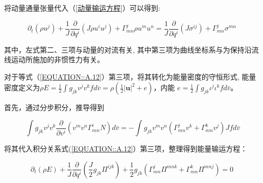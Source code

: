 \documentclass[LBMDerivation.tex]{subfiles}
\begin{document}
将动量通量张量代入（\ref{动量输运方程}）可以得到:

\begin{equation}
  \boxed{
    \partial_{t}\left(\rho u^{j}\right)+\frac{1}{J} \frac{\partial}{\partial q^{i}}\left(J \rho u^{i} u^{j} \right)+\Gamma_{mn}^{j} \rho u^{m} u^{n}
    = \frac{1}{J} \frac{\partial}{\partial q^{i}}\left(J \sigma^{ij} \right) + \Gamma_{mn}^{j} \sigma^{mn} }
  \label{动量方程输运形式} ~
\end{equation}
%



其中，左式第二、三项与动量的对流有关, 其中第三项为曲线坐标系与为保持沿流线运动所施加的非惯性力有关。
%
%

对于等式（\ref{EQUATION::A.12}）第三项，将其转化为能量密度的守恒形式, 能量密度定义为$\rho E= \frac{1}{2}\int g_{jk} v^{j}v^{k} f d\bar{v} =\rho (\frac{1}{2}|\boldsymbol{u}|^2+e)$，内能 $e=\frac{1}{2}\int g_{jk} \iota^{j} \iota^{k} f  d \bar{v}$。

首先，通过分步积分，推导得到

\begin{equation}
  \int g_{jk} v^{j}v^{k}  \frac{\partial}{\partial v^{i}}\left( v^{m} v^{n} \Gamma_{mn}^{i} N\right)d \bar{v}=-\int g_{jk}v^mv^n(\Gamma_{mn}^j v^k + \Gamma_{mn}^k v^j) Jf d\bar{v}
\end{equation}

将其代入积分关系式(\ref{EQUATION::A.12}）第三项，整理得到能量输运方程：



\begin{equation}
  \boxed{
  \partial_{t}\left(\rho E\right)  + \frac{1}{J} \frac{\partial}{\partial q^{i}}\left( \frac{J}{2} g_{jk}\Pi^{i j k} \right) + \frac{1}{2}g_{jk}(\Gamma_{mn}^j  \Pi^{mnk} + \Gamma_{mn}^k \Pi^{mnj}) =0
  }
  \label{能量输运1} ~
\end{equation}
%



\end{document}
